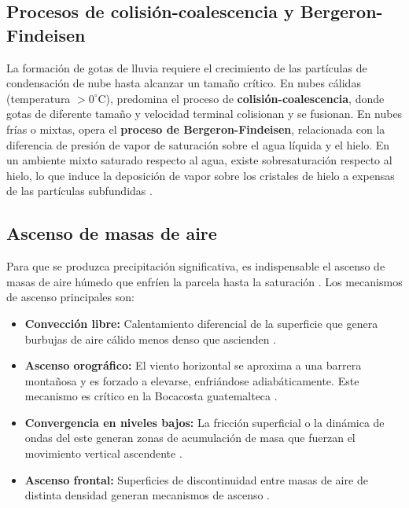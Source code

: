 \subsection{Procesos de colisión-coalescencia y Bergeron-Findeisen}
La formación de gotas de lluvia requiere el crecimiento de las partículas de condensación de nube hasta alcanzar un tamaño crítico. En nubes cálidas (temperatura \(> 0^\circ\)C), predomina el proceso de \textbf{colisión-coalescencia}, donde gotas de diferente tamaño y velocidad terminal colisionan y se fusionan. En nubes frías o mixtas, opera el \textbf{proceso de Bergeron-Findeisen}, relacionada con la diferencia de presión de vapor de saturación sobre el agua líquida y el hielo. En un ambiente mixto saturado respecto al agua, existe sobresaturación respecto al hielo, lo que induce la deposición de vapor sobre los cristales de hielo a expensas de las partículas subfundidas \citep{SupersaturationofWaterVaporinClouds}.

\subsection{Ascenso de masas de aire}
Para que se produzca precipitación significativa, es indispensable el ascenso de masas de aire húmedo que enfríen la parcela hasta la saturación \cite{houze2014cloud, pidwirny2006cloud, nws_cloud_development}. Los mecanismos de ascenso principales son:
\begin{itemize}
    \item \textbf{Convección libre:} Calentamiento diferencial de la superficie que genera burbujas de aire cálido menos denso que ascienden \citep{houze2014cloud, geerts2002convective, pidwirny2006cloud}.
    \item \textbf{Ascenso orográfico:} El viento horizontal se aproxima a una barrera montañosa y es forzado a elevarse, enfriándose adiabáticamente. Este mecanismo es crítico en la Bocacosta guatemalteca \citep{houze2014cloud, atmosferica1986viento, herrera2017descripcion, whiteman2000mountain}.
    \item \textbf{Convergencia en niveles bajos:} La fricción superficial o la dinámica de ondas del este generan zonas de acumulación de masa que fuerzan el movimiento vertical ascendente \citep{houze2014cloud, pidwirny2006cloud, makgabutlane_convergence_metservice}.
    \item \textbf{Ascenso frontal:} Superficies de discontinuidad entre masas de aire de distinta densidad generan mecanismos de ascenso \citep{houze2014cloud, nws_cloud_development}.
\end{itemize}

